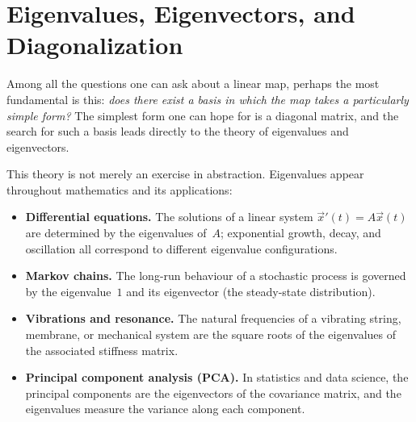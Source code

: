 
\chapter{Eigenvalues, Eigenvectors, and Diagonalization}\label{ch:eigenvalues}


Among all the questions one can ask about a linear map, perhaps the
most fundamental is this: \emph{does there exist a basis in which the
map takes a particularly simple form?}  The simplest form one can hope
for is a diagonal matrix, and the search for such a basis leads
directly to the theory of eigenvalues and eigenvectors.

This theory is not merely an exercise in abstraction.  Eigenvalues
appear throughout mathematics and its applications:
\begin{itemize}
  \item \textbf{Differential equations.}  The solutions of a linear
    system $\vec{x}'(t) = A\vec{x}(t)$ are determined by the
    eigenvalues of~$A$; exponential growth, decay, and oscillation all
    correspond to different eigenvalue configurations.
  \item \textbf{Markov chains.}  The long-run behaviour of a stochastic
    process is governed by the eigenvalue~$1$ and its eigenvector (the
    steady-state distribution).
  \item \textbf{Vibrations and resonance.}  The natural frequencies of a
    vibrating string, membrane, or mechanical system are the square
    roots of the eigenvalues of the associated stiffness matrix.
  \item \textbf{Principal component analysis (PCA).}  In statistics and
    data science, the principal components are the eigenvectors of the
    covariance matrix, and the eigenvalues measure the variance along
    each component.
\end{itemize}

